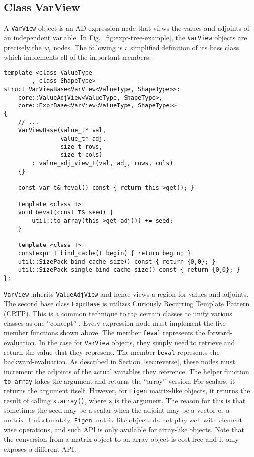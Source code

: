 \subsection{Class VarView}\label{ssec:var_view}

A \verb|VarView| object is an AD expression node
that views the values and adjoints of an independent variable.
In Fig.~\ref{fig:expr-tree-example}, the \verb|VarView| objects are precisely the $w_i$ nodes.
The following is a simplified definition of its base class, 
which implements all of the important members:
\begin{lstlisting}[style=customcpp]
template <class ValueType
        , class ShapeType>
struct VarViewBase<VarView<ValueType, ShapeType>>:
    core::ValueAdjView<ValueType, ShapeType>,
    core::ExprBase<VarView<ValueType, ShapeType>>
{
    // ...
    VarViewBase(value_t* val,
                value_t* adj,
                size_t rows,
                size_t cols)
        : value_adj_view_t(val, adj, rows, cols)
    {}

    const var_t& feval() const { return this->get(); }

    template <class T>
    void beval(const T& seed) { 
        util::to_array(this->get_adj()) += seed; 
    }

    template <class T>
    constexpr T bind_cache(T begin) { return begin; }
    util::SizePack bind_cache_size() const { return {0,0}; }
    util::SizePack single_bind_cache_size() const { return {0,0}; }
};
\end{lstlisting}

\verb|VarView| inherits \verb|ValueAdjView| and hence views
a region for values and adjoints.
The second base class \verb|ExprBase| is utilizes Curiously Recurring Template Pattern (CRTP).
This is a common technique to tag certain classes to unify various classes as one ``concept''
.
Every expression node must implement the five member functions shown above.
The member \verb|feval| represents the forward-evaluation.
In the case for \verb|VarView| objects, 
they simply need to retrieve and return the value that they represent.
The member \verb|beval| represents the backward-evaluation.
As described in Section~\ref{sec:reverse}, 
these nodes must increment the adjoints of the actual variables they reference.
The helper function \verb|to_array| takes the argument and returns the ``array'' version.
For scalars, it returns the argument itself.
However, for \verb|Eigen| matrix-like objects, 
it returns the result of calling \verb|x.array()|, where \verb|x| is the argument.
The reason for this is that sometimes the seed may be a scalar
when the adjoint may be a vector or a matrix.
Unfortunately, \verb|Eigen| matrix-like objects do not play well with element-wise operations,
and such API is only available for array-like objects.
Note that the conversion from a matrix object to an array object 
is cost-free and it only exposes a different API.\@


